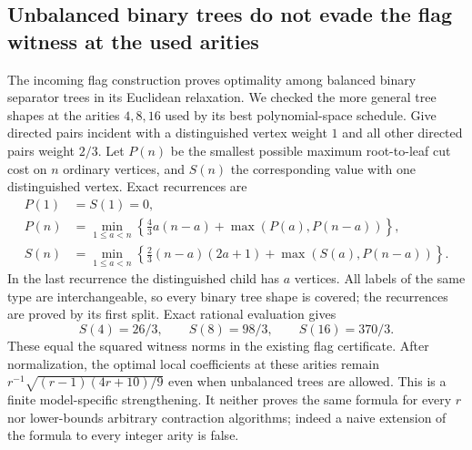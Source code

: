 \subsection{Unbalanced binary trees do not evade the flag witness at the used arities}
The incoming flag construction proves optimality among balanced binary
separator trees in its Euclidean relaxation. We checked the more general
tree shapes at the arities $4,8,16$ used by its best polynomial-space
schedule.
Give directed pairs incident with a distinguished vertex weight $1$ and
all other directed pairs weight $2/3$. Let $P(n)$ be the smallest possible
maximum root-to-leaf cut cost on $n$ ordinary vertices, and $S(n)$ the
corresponding value with one distinguished vertex. Exact recurrences are
\begin{align*}
 P(1)&=S(1)=0,\\
 P(n)&=\min_{1\le a<n}\left\{\frac43a(n-a)
                      +\max(P(a),P(n-a))\right\},\\
 S(n)&=\min_{1\le a<n}\left\{\frac23(n-a)(2a+1)
                      +\max(S(a),P(n-a))\right\}.
\end{align*}
In the last recurrence the distinguished child has $a$ vertices.
All labels of the same type are interchangeable, so every binary tree
shape is covered; the recurrences are proved by its first split.
Exact rational evaluation gives
\[
 S(4)=26/3,\qquad S(8)=98/3,\qquad S(16)=370/3.
\]
These equal the squared witness norms in the existing flag certificate.
After normalization, the optimal local coefficients at these arities
remain $r^{-1}\sqrt{(r-1)(4r+10)/9}$ even when unbalanced trees are
allowed. This is a finite model-specific strengthening. It neither proves
the same formula for every $r$ nor lower-bounds arbitrary contraction
algorithms; indeed a naive extension of the formula to every integer
arity is false.
